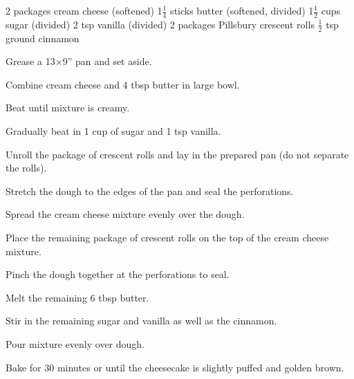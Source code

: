 \dishtype{}
\begin{ingreds}
    2 packages cream cheese (softened)
    1$\frac{1}{4}$ sticks butter (softened, divided)
    1$\frac{1}{2}$ cups sugar (divided)
    2 tsp vanilla (divided)
    2 packages Pillsbury\textsuperscript{\textregistered} crescent rolls 
    $\frac{1}{2}$ tsp ground cinnamon
\end{ingreds}
\begin{method}
    Grease a 13$\times$9'' pan and set aside.\par
    Combine cream cheese and 4 tbsp butter in large bowl.\par
    Beat until mixture is creamy.\par
    Gradually beat in 1 cup of sugar and 1 tsp vanilla.\par
    Unroll the package of crescent rolls and lay in the prepared pan (do not separate the rolls).\par
    Stretch the dough to the edges of the pan and seal the perforations.\par
    Spread the cream cheese mixture evenly over the dough.\par
    Place the remaining package of crescent rolls on the top of the cream cheese mixture.\par
    Pinch the dough together at the perforations to seal.\par
    Melt the remaining 6 tbsp butter.\par
    Stir in the remaining sugar and vanilla as well as the cinnamon.\par
    Pour mixture evenly over dough.\par
    Bake for 30 minutes or until the cheesecake is slightly puffed and golden brown.
\end{method}